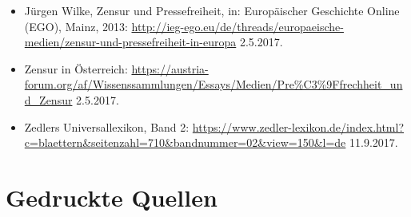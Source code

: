 \documentclass[
    a4paper,
    12pt,
    hyphens,
    chapterprefix=true,
    headheight=33pt,
    footheight=29pt,
    headings=optiontohead,
]{scrartcl}
\begin{document}
{\begin{itemize}
\item{Jürgen Wilke, Zensur und Pressefreiheit, in: Europäischer Geschichte Online (EGO), Mainz, 2013: \url{http://ieg-ego.eu/de/threads/europaeische-medien/zensur-und-pressefreiheit-in-europa} 2.5.2017.}
\item{Zensur in Österreich: \url{https://austria-forum.org/af/Wissenssammlungen/Essays/Medien/Pre\%C3\%9Ffrechheit_und_Zensur} 2.5.2017.}
\item{Zedlers Universallexikon, Band 2: \url{https://www.zedler-lexikon.de/index.html?c=blaettern&seitenzahl=710&bandnummer=02&view=150&l=de} 11.9.2017.}
\end{itemize}


\section{Gedruckte Quellen}

}
\end{document}

